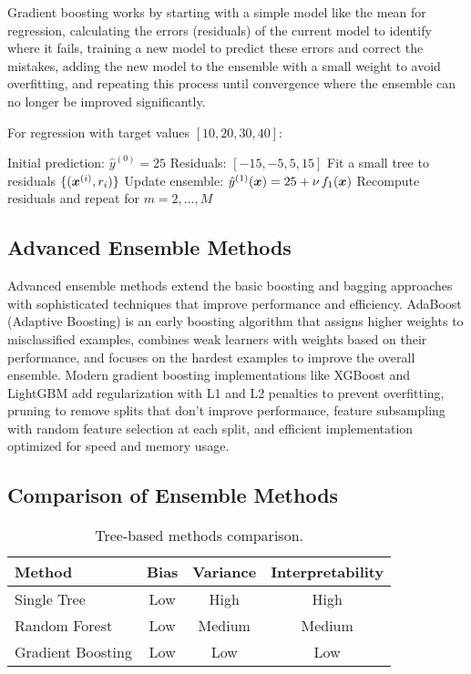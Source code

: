Gradient boosting works by starting with a simple model like the mean for regression, calculating the errors (residuals) of the current model to identify where it fails, training a new model to predict these errors and correct the mistakes, adding the new model to the ensemble with a small weight to avoid overfitting, and repeating this process until convergence where the ensemble can no longer be improved significantly.

\begin{example}
For regression with target values $[10, 20, 30, 40]$:

\begin{algorithmic}[1]
\State Initial prediction: $\hat{y}^{(0)} = 25$ 
\State Residuals: $[-15, -5, 5, 15]$ 
\State Fit a small tree to residuals $\{(\boldsymbol{x}^{(i)}, r_i)\}$
\State Update ensemble: $\hat{y}^{(1)}(\boldsymbol{x}) = 25 + \nu\, f_1(\boldsymbol{x})$
\State Recompute residuals and repeat for $m=2,\dots,M$
\end{algorithmic}
\end{example}

\subsection{Advanced Ensemble Methods}

Advanced ensemble methods extend the basic boosting and bagging approaches with sophisticated techniques that improve performance and efficiency. AdaBoost (Adaptive Boosting) is an early boosting algorithm that assigns higher weights to misclassified examples, combines weak learners with weights based on their performance, and focuses on the hardest examples to improve the overall ensemble. Modern gradient boosting implementations like XGBoost and LightGBM add regularization with L1 and L2 penalties to prevent overfitting, pruning to remove splits that don't improve performance, feature subsampling with random feature selection at each split, and efficient implementation optimized for speed and memory usage.

\subsection{Comparison of Ensemble Methods}

\begin{table}[htbp]
\centering
\begin{tabular}{lccc}
\toprule
Method & Bias & Variance & Interpretability \\
\midrule
Single Tree & Low & High & High \\
Random Forest & Low & Medium & Medium \\
Gradient Boosting & Low & Low & Low \\
\bottomrule
\end{tabular}
\caption{Tree-based methods comparison.}
\label{tab:ensemble-comparison}
\end{table}

